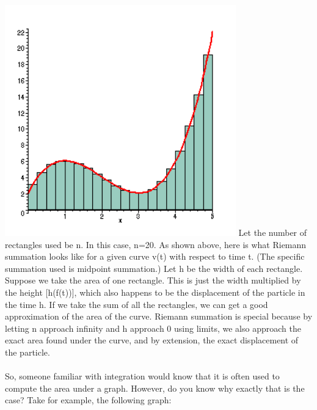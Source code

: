 \documentclass[a4paper,12pt,oneside]{book}
\begin{document}
    \centering
    \includegraphics[width=10cm]{i_int20.png}
\justifying
\newline
\newline Let the number of rectangles used be n. In this case, n=20.
\newline As shown above, here is what Riemann summation looks like for a given curve v(t) with respect to time t. (The specific summation used is midpoint summation.) Let h be the width of each rectangle.
\newline Suppose we take the area of one rectangle. This is just the width multiplied by the height [h(f(t))], which also happens to be the displacement of the particle in the time h. If we take the sum of all the rectangles, we can get a good approximation of the area of the curve.
\newline
\newline Riemann summation is special because by letting n approach infinity and h approach 0 using limits, we also approach the exact area found under the curve, and by extension, the exact displacement of the particle.\\\\
So, someone familiar with integration would know that it is often used to compute the area under a graph. However, do you know why exactly that is the case?  
\newline Take for example, the following graph: 
\end{document}

